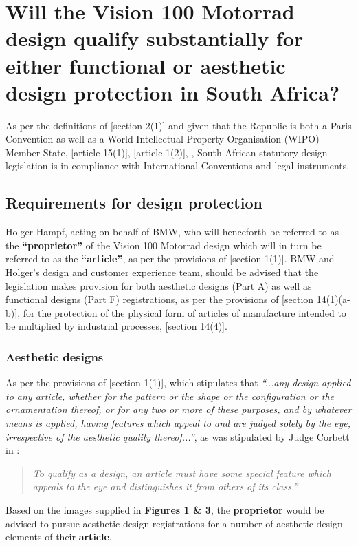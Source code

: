 \documentclass[11pt]{article}
\begin{document}
\section{Will the \textbf{Vision 100 Motorrad} design qualify substantially for either functional or aesthetic design protection in South Africa?}
\label{sec:org1190d9f}
As per the definitions of [section 2(1)]\cite{rsa93_designs_act} and given that the
Republic is both a Paris Convention as well as a World Intellectual Property
Organisation (WIPO) Member State, [article 15(1)]\cite{wto17_trips}, [article
1(2)]\cite{wipo83_paris_conve_protect_ip}, \cite{wipo25_hague_agreement}, South African statutory design
legislation is in compliance with International Conventions and legal instruments.

\subsection{Requirements for design protection}
\label{sec:org7cf2b7b}

Holger Hampf, acting on behalf of BMW, who will henceforth be referred to as the
\textbf{``proprietor''} of the Vision 100 Motorrad design which will in turn be
referred to as the \textbf{``article''}, as per the provisions of [section
1(1)]\cite{rsa93_designs_act}. BMW and Holger's design and customer experience team,
should be advised that the legislation makes provision for both \uline{aesthetic
designs} (Part A) as well as \uline{functional designs} (Part F) registrations, as per
the provisions of [section 14(1)(a-b)]\cite{rsa93_designs_act}, for the protection
of the physical form of articles of manufacture intended to be multiplied
by industrial processes, [section 14(4)]\cite{rsa93_designs_act}.

\subsubsection{Aesthetic designs}
\label{sec:orga47b203}

As per the provisions of [section 1(1)]\cite{rsa93_designs_act}, which stipulates
that \textit{``...any design applied to any article, whether for the
pattern or the shape or the configuration or the ornamentation thereof, or for
any two or more of these purposes, and by whatever means is applied, having
features which appeal to and are judged solely by the eye, irrespective of the
aesthetic quality thereof...''}, as was stipulated by Judge Corbett in
 \cite{corbett84_homecraft_steel_v_sm_hare}:
\begin{quote}
\textit{To qualify as a design, an article must have some special feature
which appeals to the eye and distinguishes it from others of its class.''}
\end{quote}
Based on the images supplied in \textbf{Figures 1 \& 3}, the \textbf{proprietor} would be
advised to pursue aesthetic design registrations for a number of aesthetic design
elements of their \textbf{article}.
\end{document}
